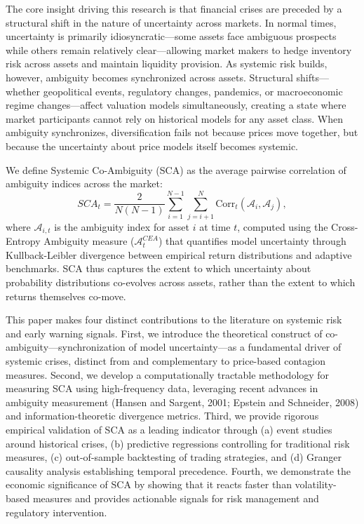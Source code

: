 \documentclass[preprint,12pt,authoryear]{elsarticle}
\begin{document}
The core insight driving this research is that financial crises are preceded by a structural shift in the nature of uncertainty across markets. In normal times, uncertainty is primarily idiosyncratic—some assets face ambiguous prospects while others remain relatively clear—allowing market makers to hedge inventory risk across assets and maintain liquidity provision. As systemic risk builds, however, ambiguity becomes synchronized across assets. Structural shifts—whether geopolitical events, regulatory changes, pandemics, or macroeconomic regime changes—affect valuation models simultaneously, creating a state where market participants cannot rely on historical models for any asset class. When ambiguity synchronizes, diversification fails not because prices move together, but because the uncertainty about price models itself becomes systemic.

We define Systemic Co-Ambiguity (SCA) as the average pairwise correlation of ambiguity indices across the market:
\begin{equation}
SCA_t = \frac{2}{N(N-1)} \sum_{i=1}^{N-1} \sum_{j=i+1}^{N} \text{Corr}_t(\mathcal{A}_{i}, \mathcal{A}_{j}),
\end{equation}
where $\mathcal{A}_{i,t}$ is the ambiguity index for asset $i$ at time $t$, computed using the Cross-Entropy Ambiguity measure ($\mathcal{A}^{CEA}_t$) that quantifies model uncertainty through Kullback-Leibler divergence between empirical return distributions and adaptive benchmarks. SCA thus captures the extent to which uncertainty about probability distributions co-evolves across assets, rather than the extent to which returns themselves co-move.

This paper makes four distinct contributions to the literature on systemic risk and early warning signals. First, we introduce the theoretical construct of co-ambiguity—synchronization of model uncertainty—as a fundamental driver of systemic crises, distinct from and complementary to price-based contagion measures. Second, we develop a computationally tractable methodology for measuring SCA using high-frequency data, leveraging recent advances in ambiguity measurement (Hansen and Sargent, 2001; Epstein and Schneider, 2008) and information-theoretic divergence metrics. Third, we provide rigorous empirical validation of SCA as a leading indicator through (a) event studies around historical crises, (b) predictive regressions controlling for traditional risk measures, (c) out-of-sample backtesting of trading strategies, and (d) Granger causality analysis establishing temporal precedence. Fourth, we demonstrate the economic significance of SCA by showing that it reacts faster than volatility-based measures and provides actionable signals for risk management and regulatory intervention.
\end{document}
